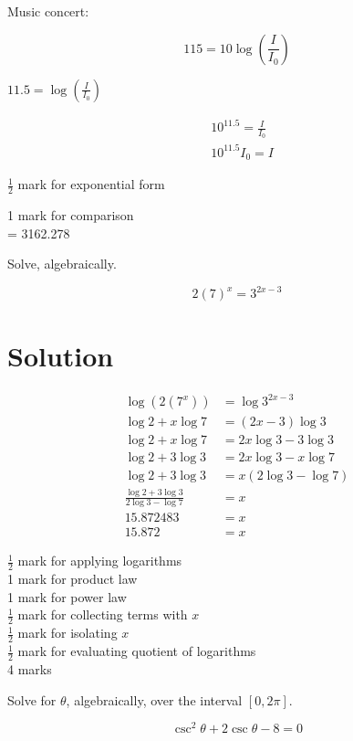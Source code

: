 \documentclass[10pt]{article}
\begin{document}
Music concert:

$$
115=10 \log \left(\frac{I}{I_{0}}\right)
$$

$11.5=\log \left(\frac{I}{I_{0}}\right)$

$$
\begin{aligned}
& 10^{11.5}=\frac{I}{I_{0}} \\
& 10^{11.5} I_{0}=I
\end{aligned}
$$

$\frac{1}{2}$ mark for exponential form

1 mark for comparison\\
= 3162.278

Solve, algebraically.

$$
2(7)^{x}=3^{2 x-3}
$$

\section*{Solution}
$$
\begin{aligned}
\log \left(2\left(7^{x}\right)\right) & =\log 3^{2 x-3} \\
\log 2+x \log 7 & =(2 x-3) \log 3 \\
\log 2+x \log 7 & =2 x \log 3-3 \log 3 \\
\log 2+3 \log 3 & =2 x \log 3-x \log 7 \\
\log 2+3 \log 3 & =x(2 \log 3-\log 7) \\
\frac{\log 2+3 \log 3}{2 \log 3-\log 7} & =x \\
15.872483 & =x \\
15.872 & =x
\end{aligned}
$$

$\frac{1}{2}$ mark for applying logarithms\\
1 mark for product law\\
1 mark for power law\\
$\frac{1}{2}$ mark for collecting terms with $x$\\
$\frac{1}{2}$ mark for isolating $x$\\
$\frac{1}{2}$ mark for evaluating quotient of logarithms\\
4 marks

Solve for $\theta$, algebraically, over the interval $[0,2 \pi]$.

$$
\csc ^{2} \theta+2 \csc \theta-8=0
$$
\end{document}
